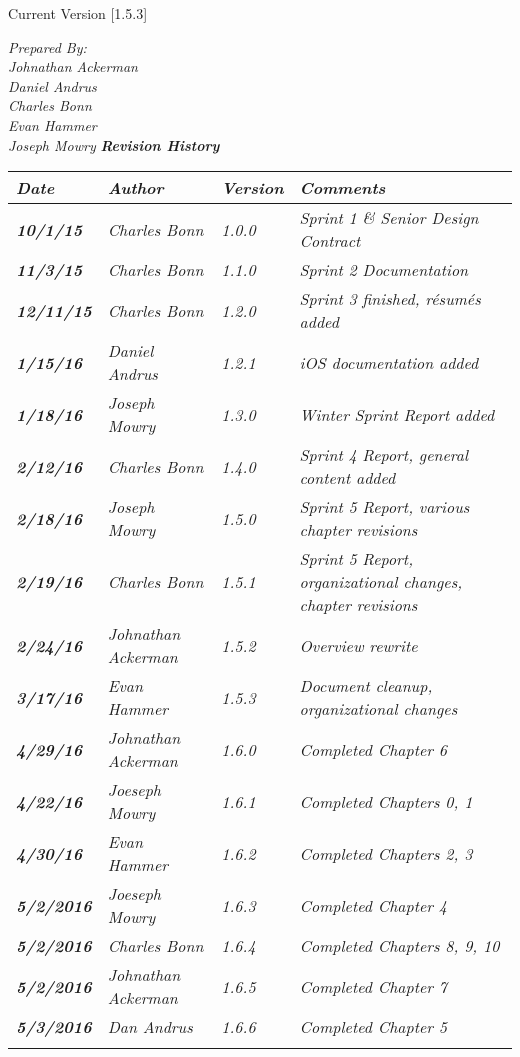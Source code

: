 


Current Version [1.5.3]
\vspace*{5mm}

{\color{SDColor5}
\noindent
\textit{Prepared By:}\\
\textit{Johnathan Ackerman}\\
\textit{Daniel Andrus}\\
\textit{Charles Bonn}\\
\textit{Evan Hammer}\\
\textit{Joseph Mowry}
}
\vfill
\noindent
{\color{SDColor3} \textit{\textbf{Revision History}}}\\
\begin{tabular}{|>{\raggedright}p{1.5cm}|>{\raggedright}p{3cm}|>{\raggedright}p{1.5cm}|>{\raggedright}p{9cm}|}
\hline
\textit{\textbf{Date}} &  \textit{\textbf{Author}} & \textit{\textbf{Version}} & \textit{\textbf{Comments}}\tabularnewline
\hline
 \textit{\textbf{10/1/15}} & \textit{Charles Bonn} & \textit{1.0.0} & \textit{Sprint 1 \& Senior Design Contract}\tabularnewline
 \hline
  \textit{\textbf{11/3/15}} & \textit{Charles Bonn} & \textit{1.1.0} & \textit{Sprint 2 Documentation}\tabularnewline
 \hline
 \textit{\textbf{12/11/15}} & \textit{Charles Bonn} & \textit{1.2.0} & \textit{Sprint 3 finished, résumés added}\tabularnewline
\hline
 \textit{\textbf{1/15/16}} & \textit{Daniel Andrus} & \textit{1.2.1} & \textit{iOS documentation added}\tabularnewline
\hline
 \textit{\textbf{1/18/16}} & \textit{Joseph Mowry} & \textit{1.3.0} & \textit{Winter Sprint Report added}\tabularnewline
\hline
 \textit{\textbf{2/12/16}} & \textit{Charles Bonn} & \textit{1.4.0} & \textit{Sprint 4 Report, general content added}\tabularnewline
\hline
 \textit{\textbf{2/18/16}} & \textit{Joseph Mowry} & \textit{1.5.0} & \textit{Sprint 5 Report, various chapter revisions}\tabularnewline
\hline
 \textit{\textbf{2/19/16}} & \textit{Charles Bonn} & \textit{1.5.1} & \textit{Sprint 5 Report, organizational changes, chapter revisions}\tabularnewline
\hline
 \textit{\textbf{2/24/16}} & \textit{Johnathan Ackerman} & \textit{1.5.2} & \textit{Overview rewrite}\tabularnewline
\hline
 \textit{\textbf{3/17/16}} & \textit{Evan Hammer} & \textit{1.5.3} & \textit{Document cleanup, organizational changes}\tabularnewline
\hline
\textit{\textbf{4/29/16}} & \textit{Johnathan Ackerman} & \textit{1.6.0} & \textit{Completed Chapter 6}\tabularnewline
\hline
\textit{\textbf{4/22/16}} & \textit{Joeseph Mowry} & \textit{1.6.1} & \textit{Completed Chapters 0, 1}\tabularnewline
\hline
\textit{\textbf{4/30/16}} & \textit{Evan Hammer} & \textit{1.6.2} & \textit{Completed Chapters 2, 3}\tabularnewline
\hline
\textit{\textbf{5/2/2016}} & \textit{Joeseph Mowry} & \textit{1.6.3} & \textit{Completed Chapter 4}\tabularnewline
\hline
\textit{\textbf{5/2/2016}} & \textit{Charles Bonn} & \textit{1.6.4} & \textit{Completed Chapters 8, 9, 10}\tabularnewline
\hline
\textit{\textbf{5/2/2016}} & \textit{Johnathan Ackerman} & \textit{1.6.5} & \textit{Completed Chapter 7}\tabularnewline
\hline
\textit{\textbf{5/3/2016}} & \textit{Dan Andrus} & \textit{1.6.6} & \textit{Completed Chapter 5}\tabularnewline
 &  &  & \tabularnewline
\hline
\end{tabular}
\vfill

